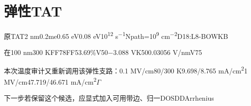 \documentclass[11pt,a4paper]{article}
\begin{document}
\section{{\cjkfont 弹性}\allowbreak{}TAT\allowbreak{}}\label{sec:33}
{\cjkfont 原}\allowbreak{}TAT\allowbreak{}2 nm\allowbreak{}0.2me\allowbreak{}0.65 eV\allowbreak{}0.08 eV\allowbreak{}10\textsuperscript{12} s\textsuperscript{−1}\allowbreak{}Npath=\allowbreak{}10\textsuperscript{9} cm\textsuperscript{−2}\allowbreak{}D18:L8-BO\allowbreak{}WKB\allowbreak{}
\par
{\cjkfont 在}\allowbreak{}100 nm\allowbreak{}300 K\allowbreak{}FF78\allowbreak{}FF\allowbreak{}53.69\%\allowbreak{}V50\allowbreak{}−3.088 V\allowbreak{}K50\allowbreak{}0.03056 V/nm\allowbreak{}V75\allowbreak{}
\par
{\cjkfont 本次温度审计又重新调用该弹性支路：}\allowbreak{}0.1 MV/cm\allowbreak{}80/300 K\allowbreak{}9.698/8.765 mA/cm\textsuperscript{2}\allowbreak{}1 MV/cm\allowbreak{}47.719/46.671 mA/cm\textsuperscript{2}\allowbreak{}\ensuremath{\Gamma}\allowbreak{}
\par
{\cjkfont 下一步若保留这个候选，应显式加入可用带边、归一}\allowbreak{}DOS\allowbreak{}DD\allowbreak{}Arrhenius\allowbreak{}
\end{document}
